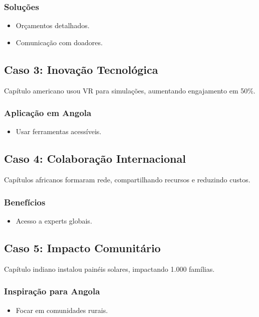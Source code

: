 \documentclass[12pt]{article}
\begin{document}
\subsubsection{Soluções}
\begin{itemize}
    \item Orçamentos detalhados.
    \item Comunicação com doadores.
\end{itemize}

\subsection{Caso 3: Inovação Tecnológica}
Capítulo americano usou VR para simulações, aumentando engajamento em 50\%.

\subsubsection{Aplicação em Angola}
\begin{itemize}
    \item Usar ferramentas acessíveis.
\end{itemize}

\subsection{Caso 4: Colaboração Internacional}
Capítulos africanos formaram rede, compartilhando recursos e reduzindo custos.

\subsubsection{Benefícios}
\begin{itemize}
    \item Acesso a experts globais.
\end{itemize}

\subsection{Caso 5: Impacto Comunitário}
Capítulo indiano instalou painéis solares, impactando 1.000 famílias.

\subsubsection{Inspiração para Angola}
\begin{itemize}
    \item Focar em comunidades rurais.
\end{itemize}
\end{document}
